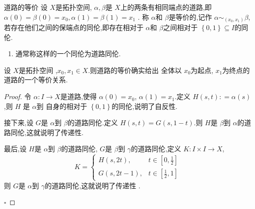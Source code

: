 \documentclass[../../几何与拓扑.tex]{subfiles}
\begin{document}
\begin{definition}{道路的等价}
    设 \(  X  \)是拓扑空间, \(   \alpha , \beta   \)是 \(  X  \)上的两条有相同端点的道路,即 \(   \alpha \left( 0 \right)=  \beta \left( 0 \right)= x_0    , \alpha \left( 1 \right)= \beta \left( 1 \right)= x_1  \) .
    称 \(  \alpha   \)和 \(  \beta   \)是等价的,记作 \(   \alpha \sim _{\left( x_0,x_1 \right) }\beta   \), 若存在他们之间的保端点的同伦,即存在相对于 \(  \alpha   \)和 \(  \beta   \)之间相对于 \(  \left\{ 0,1 \right\}  \subseteq I\)的同伦.        
\end{definition}

\begin{remark}
    \begin{enumerate}
        \item 通常称这样的一个同伦为道路同伦.
    \end{enumerate}
    
\end{remark}

\begin{theorem}
    设 \(  X  \)是拓扑空间 ,\(  x_0,x_1 \in X  \).则道路的等价确实给出 全体以 \(  x_0  \)为起点, \(  x_1  \)为终点的道路的一个等价关系.    
\end{theorem}

\begin{proof}

    令 \(   \alpha : I \to X  \)是道路,使得 \(  \alpha \left( 0 \right)= x_0   \), \(  \alpha \left( 1 \right)= x_1   \).定义 \(  H\left( s,t \right): =    \alpha \left( s \right)    \),则 \(  H  \) 是   \(  \alpha   \)到
    自身的相对于 \(  \left\{ 0,1 \right\}  \)的同伦,说明了自反性.
    
    接下来,设  \(  G  \)是 \(  \alpha   \)到 \(  \beta   \)的道路同伦.定义 \(  H\left( s,t \right)=  G\left( s,1-t \right)    \).则 \(  H  \)是 \(  \beta   \)到 \(  \alpha   \)的道路同伦,这就说明了传递性.
    
    最后,设 \(  H  \)是 \(  \alpha   \)到 \(  \beta   \)的道路同伦, \(  G  \)是 \(  \beta   \)到 \(  \gamma  \)的道路同伦,定义 \(  K:I \times I \to X  \), \[
    K=  \begin{cases} H\left( s,2t \right),& t \in [0,\frac{1}{2}]  \\ 
     G\left( s, 2t-1\right),& t \in [\frac{1}{2},1] \end{cases} 
    \]       则 \(  G  \)是 \(   \alpha   \)到 \(   \gamma   \)的道路同伦,这就说明了传递性  . 

    \hfill $\square$
\end{proof}
\end{document}
